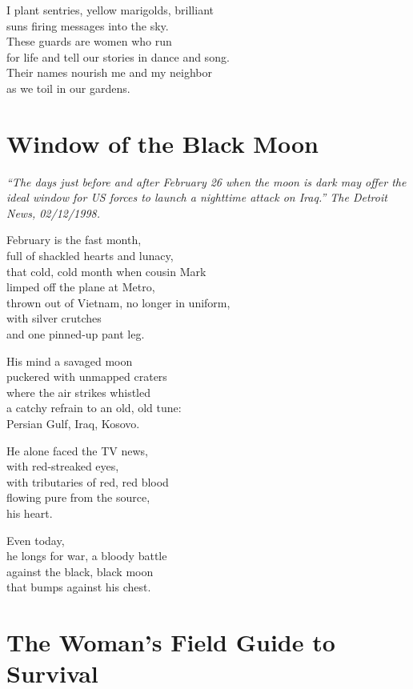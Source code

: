 \documentclass[twoside,10pt]{book}
\begin{document}
I plant sentries, yellow marigolds, brilliant\\
suns firing messages into the sky.\\
These guards are women who run\\
for life and tell our stories in dance and song.\\
Their names nourish me and my neighbor\\
as we toil in our gardens.


\clearpage
\section{Window of the Black Moon}

\emph{``The days just before and after February 26 when the moon is
  dark may offer the ideal window for US forces to launch a nighttime
  attack on Iraq.'' \emph{The Detroit News}, 02/12/1998.}

February is the fast month,\\
full of shackled hearts and lunacy,\\
that cold, cold month when cousin Mark\\
limped off the plane at Metro,\\
thrown out of Vietnam, no longer in uniform,\\
with silver crutches\\
and one pinned-up pant leg.

His mind a savaged moon\\
puckered with unmapped craters\\
where the air strikes whistled\\
a catchy refrain to an old, old tune:\\
Persian Gulf, Iraq, Kosovo.

He alone faced the TV news,\\
with red-streaked eyes,\\
with tributaries of red, red blood\\
flowing pure from the source,\\
his heart.

Even today,\\
he longs for war, a bloody battle\\
against the black, black moon\\
that bumps against his chest.


\clearpage
\section{The Woman's Field Guide to Survival}
\end{document}

